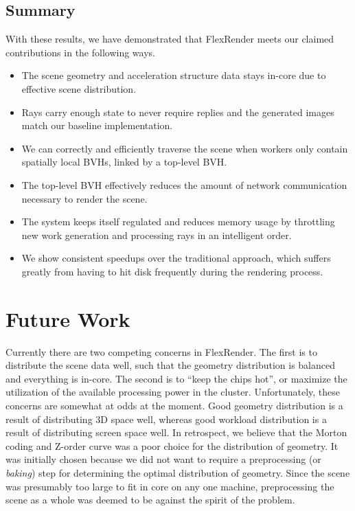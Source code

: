 \documentclass[a4paper,twoside]{article}
\begin{document}
\subsection{Summary}
\label{resultssummary}

With these results, we have demonstrated that FlexRender meets our claimed
contributions in the following ways. 

\begin{itemize}
    \item The scene geometry and acceleration structure data stays in-core due
        to effective scene distribution.
    \item Rays carry enough state to never require replies and the generated
        images match our baseline implementation.
    \item We can correctly and efficiently traverse the scene when workers
        only contain spatially local BVHs, linked by a top-level BVH.
    \item The top-level BVH effectively reduces the amount of network
        communication necessary to render the scene.
    \item The system keeps itself regulated and reduces memory usage by
        throttling new work generation and processing rays in an intelligent
        order.
    \item We show consistent speedups over the traditional approach, which
        suffers greatly from having to hit disk frequently during the
        rendering process.
\end{itemize}

\section{Future Work}
\label{futurework}

Currently there are two competing concerns in FlexRender. The first is to
distribute the scene data well, such that the geometry distribution is balanced
and everything is in-core. The second is to ``keep the chips hot'', or maximize
the utilization of the available processing power in the cluster. Unfortunately,
these concerns are somewhat at odds at the moment. Good geometry distribution
is a result of distributing 3D space well, whereas good workload distribution
is a result of distributing screen space well. In retrospect, we believe that the Morton coding and Z-order curve was
a poor choice for the distribution of geometry. It was initially chosen because
we did not want to require a preprocessing (or \emph{baking}) step for
determining the optimal distribution of geometry. Since the scene was presumably
too large to fit in core on any one machine, preprocessing the scene as a whole
was deemed to be against the spirit of the problem.
\end{document}

